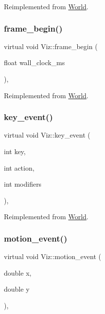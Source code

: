 Reimplemented from \mbox{\hyperlink{classWorld_adea3d936b96e1bef8eb07b6462cab236}{World}}.

\mbox{\label{classViz_a29d2f5a0af409c50243da79ada86adad}} 
\subsubsection{\texorpdfstring{frame\+\_\+begin()}{frame\_begin()}}
{\footnotesize\ttfamily virtual void Viz\+::frame\+\_\+begin (\begin{DoxyParamCaption}\item[{float}]{wall\+\_\+clock\+\_\+ms }\end{DoxyParamCaption})\hspace{0.3cm}{\ttfamily [protected]}, {\ttfamily [virtual]}}



Reimplemented from \mbox{\hyperlink{classWorld_a31a7f317338492f86ad62111c8869a98}{World}}.

\mbox{\label{classViz_ae77de461c1252a35cff01651295eddf5}} 
\subsubsection{\texorpdfstring{key\+\_\+event()}{key\_event()}}
{\footnotesize\ttfamily virtual void Viz\+::key\+\_\+event (\begin{DoxyParamCaption}\item[{int}]{key,  }\item[{int}]{action,  }\item[{int}]{modifiers }\end{DoxyParamCaption})\hspace{0.3cm}{\ttfamily [protected]}, {\ttfamily [virtual]}}



Reimplemented from \mbox{\hyperlink{classWorld_a46ecee55e2359c32f14c0d8d084dad73}{World}}.

\mbox{\label{classViz_a4ddb97f01a80d99a103b51685aaf67c8}} 
\subsubsection{\texorpdfstring{motion\+\_\+event()}{motion\_event()}}
{\footnotesize\ttfamily virtual void Viz\+::motion\+\_\+event (\begin{DoxyParamCaption}\item[{double}]{x,  }\item[{double}]{y }\end{DoxyParamCaption})\hspace{0.3cm}{\ttfamily [protected]}, {\ttfamily [virtual]}}



